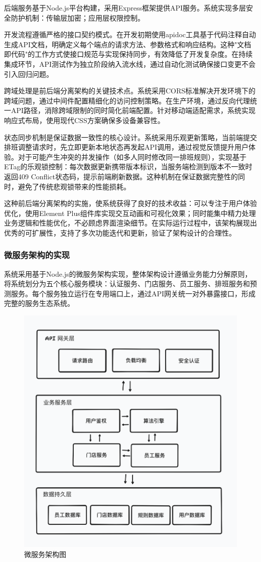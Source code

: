 \documentclass{ctexart}
\begin{document}
后端服务基于Node.js平台构建，采用Express框架提供API服务。系统实现多层安全防护机制：传输层加密；应用层权限控制。

开发流程遵循严格的接口契约模式。在开发初期使用apidoc工具基于代码注释自动生成API文档，明确定义每个端点的请求方法、参数格式和响应结构。这种"文档即代码"的工作方式使接口规范与实现保持同步，有效降低了开发复杂度。在持续集成环节，API测试作为独立阶段纳入流水线，通过自动化测试确保接口变更不会引入回归问题。

跨域处理是前后端分离架构的关键技术点。系统采用CORS标准解决开发环境下的跨域问题，通过中间件配置精细化的访问控制策略。在生产环境，通过反向代理统一API路径，消除跨域限制的同时简化前端配置。针对移动端适配需求，系统实现响应式布局，使用现代CSS方案确保多设备兼容性。

状态同步机制是保证数据一致性的核心设计。系统采用乐观更新策略，当前端提交排班调整请求时，先立即更新本地状态再发起API调用，通过视觉反馈提升用户体验。对于可能产生冲突的并发操作（如多人同时修改同一排班规则），实现基于ETag的乐观锁控制：每次数据更新携带版本标识，当服务端检测到版本不一致时返回409 Conflict状态码，提示前端刷新数据。这种机制在保证数据完整性的同时，避免了传统悲观锁带来的性能损耗。

这种前后端分离架构的实施，使系统获得了良好的技术收益：可以专注于用户体验优化，使用Element Plus组件库实现交互动画和可视化效果；同时能集中精力处理业务逻辑和性能优化，不必顾虑界面渲染细节。在实际运行过程中，该架构展现出优秀的可扩展性，支持了多次功能迭代和更新，验证了架构设计的合理性。
\subsubsection{微服务架构的实现}
系统采用基于Node.js的微服务架构实现，整体架构设计遵循业务能力分解原则，将系统划分为五个核心服务模块：认证服务、门店服务、员工服务、排班服务和预测服务。每个服务独立运行在专用端口上，通过API网关统一对外暴露接口，形成完整的服务生态系统。

\begin{figure}[H]
    \centering
    \includegraphics[width=0.8\linewidth]{./source/微服务架构图.png}
    \caption{微服务架构图}
    \label{fig:microservice-arch}
\end{figure}
\end{document}
